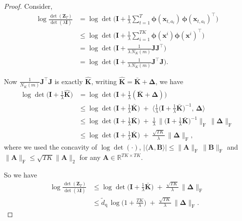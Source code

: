 \documentclass[pdflatex,sn-mathphys-num]{sn-jnl}%
\theoremstyle{thmstyleone}%
\theoremstyle{thmstyletwo}%
\theoremstyle{thmstylethree}%
\newcommand{\xbf}{\mathbf{x}}
\newcommand{\Kbf}{\mathbf{K}}
\newcommand{\Ibf}{\mathbf{I}}
\newcommand{\phibf}{\bm{\phi}}
\newcommand{\Zbf}{\mathbf{Z}}
\newcommand{\Jbf}{\mathbf{J}}
\begin{document}
\begin{appendices}
\begin{proof}
Consider,
\begin{align}
\log\frac{\det( \Zbf_T)}{\det(\lambda \Ibf)}
&= \log\det\!\Big(\Ibf + \frac{1}{\lambda}\sum_{t=1}^T  \phibf(\xbf_{t,a_t})\,\phibf(\xbf_{t,a_t})^\top\Big)\nonumber\\
&\le \log\det\!\Big(\Ibf + \frac{1}{\lambda}\sum_{i=1}^{TK} \phibf(\xbf^i) \phibf(\xbf^i)^\top\Big)\nonumber\\
&= \log\det\!\Big(\Ibf + \frac{1}{\lambda\, N_K(m)} \Jbf\Jbf^\top\Big) \\
&= \log\det\!\Big(\Ibf + \frac{1}{\lambda\, N_K(m)} \Jbf^\top \Jbf\Big). \label{eq:swap}
\end{align}





Now $\frac{1}{N_K(m)}\Jbf^\top \Jbf$ is exactly $\hat{\Kbf}$, writing
$\hat{\Kbf}=\bar{\Kbf}+\bm{\Delta}$, we have 
\begin{align*}
\log\det\!\Big(\Ibf+\frac{1}{\lambda}\hat{\Kbf}\Big)
&= \log\det\!\Big(\Ibf+\frac{1}{\lambda}(\bar{\Kbf}+\bm{\Delta})\Big)\\
&\le \log\det\!\Big(\Ibf+\frac{1}{\lambda}\bar{\Kbf}\Big)
\;+\;\Big\langle \frac{1}{\lambda}\Big(\Ibf+\frac{1}{\lambda}\bar{\Kbf}\Big)^{-1},\,\bm{\Delta}\Big\rangle \\
&\le \log\det\!\Big(\Ibf+\frac{1}{\lambda}\bar{\Kbf}\Big)
\;+\;\frac{1}{\lambda}\,\big\|\big(\Ibf+\frac{1}{\lambda}\bar{\Kbf}\big)^{-1}\big\|_{\mathrm{F}}\,\|\bm{\Delta}\|_{\mathrm{F}}  \\
&\le \log\det\!\Big(\Ibf+\frac{1}{\lambda}\bar{\Kbf}\Big)
\;+\;\frac{\sqrt{TK}}{\lambda}\,\|\bm{\Delta}\|_{\mathrm{F}},
\end{align*}
where we used the concavity of $\log\det (\cdot)$, $|\langle \mathbf A,\mathbf B\rangle|\le \|\mathbf A\|_{\mathrm{F}}\,\| \mathbf B\|_{\mathrm{F}}$ and
$\|\mathbf A\|_{\mathrm{F}} \leq \sqrt{TK}\|\mathbf A\|_2$ for any $\mathbf A \in \mathbb R^{TK \times TK}$.

So we have 
\begin{align*}
\log\frac{\det(\Zbf_T)}{\det(\lambda \Ibf)}
&\le \log\det\!\Big(\Ibf+\frac{1}{\lambda}\bar{\Kbf}\Big)
\;+\;\frac{\sqrt{TK}}{\lambda}\,\|\bm{\Delta}\|_{\mathrm{F}} \\
&\leq \widetilde{d}_{\mathrm{q}}\,\log\!\Big(1+\frac{TK}{\lambda}\Big)
\;+\; \frac{\sqrt{TK}}{\lambda}\,\|\bm{\Delta}\|_{\mathrm{F}}.
\end{align*}



\end{proof}
\end{appendices}
\end{document}
